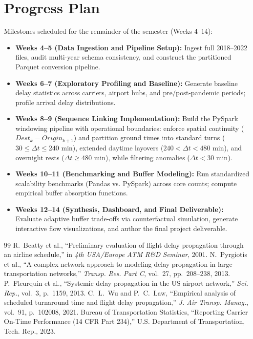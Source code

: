 \documentclass{article}
\begin{document}
\section{Progress Plan}
Milestones scheduled for the remainder of the semester (Weeks 4--14):
\begin{itemize}
    \item \textbf{Weeks 4--5 (Data Ingestion and Pipeline Setup):} Ingest full 2018--2022 files, audit multi-year schema consistency, and construct the partitioned Parquet conversion pipeline.
    \item \textbf{Weeks 6--7 (Exploratory Profiling and Baseline):} Generate baseline delay statistics across carriers, airport hubs, and pre/post-pandemic periods; profile arrival delay distributions.
    \item \textbf{Weeks 8--9 (Sequence Linking Implementation):} Build the PySpark windowing pipeline with operational boundaries: enforce spatial continuity ($Dest_k = Origin_{k+1}$) and partition ground times into standard turns ($30 \le \Delta t \le 240$ min), extended daytime layovers ($240 < \Delta t < 480$ min), and overnight rests ($\Delta t \ge 480$ min), while filtering anomalies ($\Delta t < 30$ min).
    \item \textbf{Weeks 10--11 (Benchmarking and Buffer Modeling):} Run standardized scalability benchmarks (Pandas vs. PySpark) across core counts; compute empirical buffer absorption functions.
    \item \textbf{Weeks 12--14 (Synthesis, Dashboard, and Final Deliverable):} Evaluate adaptive buffer trade-offs via counterfactual simulation, generate interactive flow visualizations, and author the final project deliverable.
\end{itemize}

\begin{thebibliography}{99}\small
{}
R.~Beatty et al., ``Preliminary evaluation of flight delay propagation through an airline schedule,'' in \textit{4th USA/Europe ATM R\&D Seminar}, 2001.
N.~Pyrgiotis et al., ``A complex network approach to modeling delay propagation in large transportation networks,'' \textit{Transp. Res. Part C}, vol.~27, pp.~208--238, 2013.
P.~Fleurquin et al., ``Systemic delay propagation in the US airport network,'' \textit{Sci. Rep.}, vol.~3, p.~1159, 2013.
C.~L.~Wu and P.~C.~Law, ``Empirical analysis of scheduled turnaround time and flight delay propagation,'' \textit{J. Air Transp. Manag.}, vol.~91, p.~102008, 2021.
Bureau of Transportation Statistics, ``Reporting Carrier On-Time Performance (14 CFR Part 234),'' U.S. Department of Transportation, Tech. Rep., 2023.
\end{thebibliography}
\end{document}
